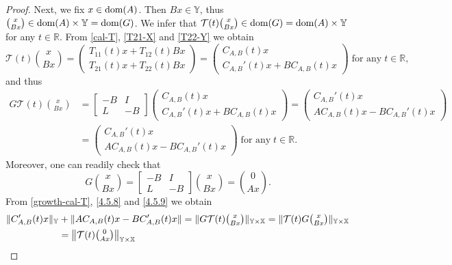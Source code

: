 \documentclass[11pt]{amsart}
\numberwithin{equation}{section}
\newcommand{\CAB}{C_{A,B}}
\newcommand{\RR}{{\mathbb R}}
\theoremstyle{remark}
\theoremstyle{definition}
\newcommand\cT{{\mathcal T}}
\newcommand\bX{{\mathbb X}}
\newcommand\bY{{\mathbb Y}}
\newcommand{\dom}{\text{\rm{dom}}}
\begin{document}
\begin{proof}
	Next, we fix $x \in \dom(A)$. Then $Bx \in \bY$, thus $\binom{x}{Bx} \in \dom(A) \times \bY = \dom(G)$. We infer that 
	$\cT(t)\binom{x}{Bx} \in \dom(G) = \dom(A) \times \bY$ for any $t\in\RR$. From \eqref{cal-T}, \eqref{T21-X} and \eqref{T22-Y} we obtain 
	\begin{equation}\label{4.5.7}
		\cT(t)\binom{x}{Bx}
		= \begin{pmatrix} T_{11}(t)x + T_{12}(t)Bx \\ T_{21}(t)x + T_{22}(t)Bx \end{pmatrix}
		= \begin{pmatrix} \CAB(t)x \\ C_{A,B}'(t)x + B\CAB(t)x \end{pmatrix} \;\mbox{for any}\; t \in \mathbb{R},
	\end{equation}	
	and thus
	\begin{align}\label{4.5.8}
		G\cT(t)\binom{x}{Bx}
		&= \begin{bmatrix} -B & I \\ L & -B \end{bmatrix}
		\begin{pmatrix} \CAB(t)x \\ C_{A,B}'(t)x + B\CAB(t)x \end{pmatrix}
		= \begin{pmatrix} C_{A,B}'(t)x \\ A\CAB(t)x - BC_{A,B}'(t)x \end{pmatrix}\nonumber\\
		&  = \begin{pmatrix} C_{A,B}'(t)x \\ A\CAB(t)x - BC_{A,B}'(t)x \end{pmatrix} \;\mbox{for any}\; t \in \mathbb{R}.	
	\end{align}	
	Moreover, one can readily check that 
	\begin{equation}\label{4.5.9}
		G\binom{x}{Bx}
		= \begin{bmatrix} -B & I \\ L & -B \end{bmatrix}\binom{x}{Bx}
		= \binom{0}{Ax}.	
	\end{equation}	
	From \eqref{growth-cal-T}, \eqref{4.5.8} and \eqref{4.5.9} we obtain
	\begin{align}\label{4.5.10}
		\|C_{A,B}'(t)x\|_\bY &+ \|A\CAB(t)x - BC_{A,B}'(t)x\|
		= \|G\cT(t)\tbinom{x}{Bx}\|_{\bY\times\bX} = \|\cT(t)G\tbinom{x}{Bx}\|_{\bY\times\bX} \nonumber\\
		&= \left\|\cT(t)\tbinom{0}{Ax}\right\|_{\bY\times\bX}

\end{align}
\end{proof}
\end{document}
